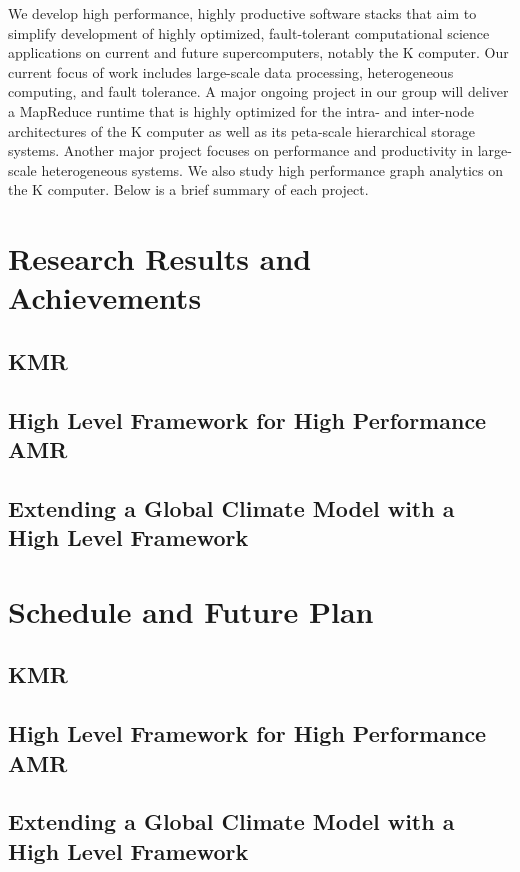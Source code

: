 \documentclass{book}
\begin{document}
We develop high performance, highly productive software stacks that aim to simplify development of highly optimized, fault-tolerant computational science applications on current and future supercomputers, notably the K computer. Our current focus of work includes large-scale data processing, heterogeneous computing, and fault tolerance. A major ongoing project in our group will deliver a MapReduce runtime that is highly optimized for the intra- and inter-node architectures of the K computer as well as its peta-scale hierarchical storage systems. Another major project focuses on performance and productivity in large-scale heterogeneous systems. We also study high performance graph analytics on the K computer. Below is a brief summary of each project.


\section{Research Results and Achievements}

\subsection{KMR}

\subsection{High Level Framework for High Performance AMR}

\subsection{Extending a Global Climate Model with a High Level Framework}


\section{Schedule and Future Plan}

\subsection{KMR}

\subsection{High Level Framework for High Performance AMR}

\subsection{Extending a Global Climate Model with a High Level Framework}
\end{document}
